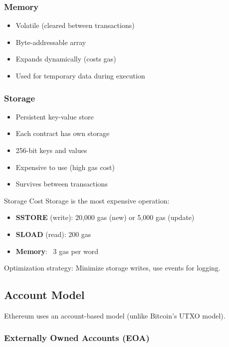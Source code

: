 \documentclass[11pt,a4paper]{article}
\begin{document}
\subsubsection{Memory}

\begin{itemize}
  \item Volatile (cleared between transactions)
  \item Byte-addressable array
  \item Expands dynamically (costs gas)
  \item Used for temporary data during execution
\end{itemize}

\subsubsection{Storage}

\begin{itemize}
  \item Persistent key-value store
  \item Each contract has own storage
  \item 256-bit keys and values
  \item Expensive to use (high gas cost)
  \item Survives between transactions
\end{itemize}

\begin{keybox}{Storage Cost}
Storage is the most expensive operation:
\begin{itemize}
  \item \textbf{SSTORE} (write): 20,000 gas (new) or 5,000 gas (update)
  \item \textbf{SLOAD} (read): 200 gas
  \item \textbf{Memory}: ~3 gas per word
\end{itemize}

Optimization strategy: Minimize storage writes, use events for logging.
\end{keybox}

\subsection{Account Model}

Ethereum uses an account-based model (unlike Bitcoin's UTXO model).

\subsubsection{Externally Owned Accounts (EOA)}
\end{document}
